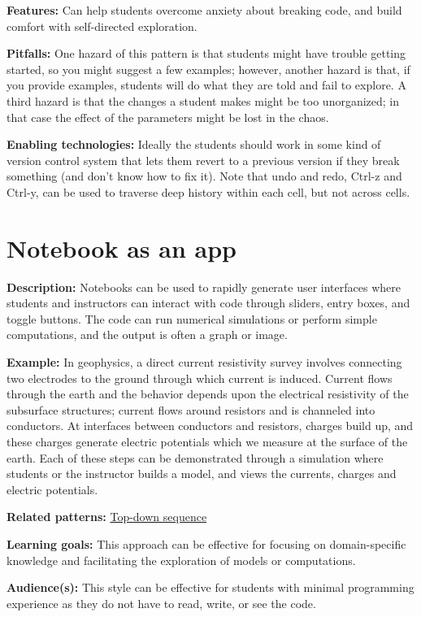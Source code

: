 \documentclass[]{book}
\begin{document}
\textbf{Features:} Can help students overcome anxiety about breaking
code, and build comfort with self-directed exploration.

\textbf{Pitfalls:} One hazard of this pattern is that students might
have trouble getting started, so you might suggest a few examples;
however, another hazard is that, if you provide examples, students will
do what they are told and fail to explore. A third hazard is that the
changes a student makes might be too unorganized; in that case the
effect of the parameters might be lost in the chaos.

\textbf{Enabling technologies:} Ideally the students should work in some
kind of version control system that lets them revert to a previous
version if they break something (and don't know how to fix it). Note
that undo and redo, Ctrl-z and Ctrl-y, can be used to traverse deep
history within each cell, but not across cells.

\section{Notebook as an app}\label{notebook-as-an-app}

\textbf{Description:} Notebooks can be used to rapidly generate user
interfaces where students and instructors can interact with code through
sliders, entry boxes, and toggle buttons. The code can run numerical
simulations or perform simple computations, and the output is often a
graph or image.

\textbf{Example:} In geophysics, a direct current resistivity survey
involves connecting two electrodes to the ground through which current
is induced. Current flows through the earth and the behavior depends
upon the electrical resistivity of the subsurface structures; current
flows around resistors and is channeled into conductors. At interfaces
between conductors and resistors, charges build up, and these charges
generate electric potentials which we measure at the surface of the
earth. Each of these steps can be demonstrated through a simulation
where students or the instructor builds a model, and views the currents,
charges and electric potentials.

\textbf{Related patterns:}
\protect\hyperlink{top-down-sequence}{Top-down sequence}

\textbf{Learning goals:} This approach can be effective for focusing on
domain-specific knowledge and facilitating the exploration of models or
computations.

\textbf{Audience(s):} This style can be effective for students with
minimal programming experience as they do not have to read, write, or
see the code.
\end{document}
